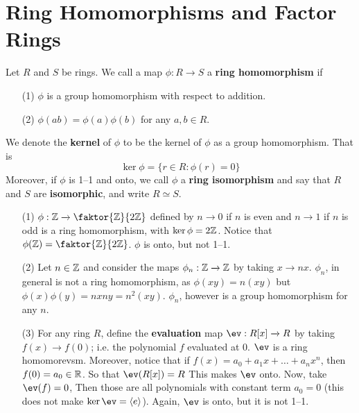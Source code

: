 \section{Ring Homomorphisms and Factor Rings}
\label{section_5.3}

\begin{definition}
  Let $R$ and  $S$ be rings. We call a map  $\phi:R \xrightarrow{} S$ a
  \textbf{ring homomorphism} if
  \begin{enumerate}
    \item[(1)] $\phi$ is a group homomorphism with respect to addition.

    \item[(2)] $\phi(ab)=\phi(a)\phi(b)$ for any $a,b \in R$.
  \end{enumerate}
  We denote the \textbf{kernel} of $\phi$ to be the kernel of $\phi$ as a
  group homomorphism. That is
  \begin{equation*}
    \ker{\phi}=\{r \in R : \phi(r)=0\}
  \end{equation*}
  Moreover, if $\phi$ is 1--1 and onto, we call $\phi$ a \textbf{ring
  isomorphism} and say that $R$ and $S$ are \textbf{isomorphic},
  and write $R \simeq S$.
\end{definition}

\begin{example}\label{example_5.9}
  \begin{enumerate}
    \item[(1)] $\phi:\Z \xrightarrow{} \faktor{\Z}{2\Z}$ defined by $n
      \xrightarrow{} 0$ if $n$ is even and  $n \xrightarrow{} 1$ if $n$ is
      odd is a ring homomorphism, with  $\ker{\phi}=2\mathbb{Z}$. Notice that
      $\phi(\Z)=\faktor{\Z}{2\Z}$. $\phi$ is onto, but not 1--1.

    \item[(2)] Let $n \in \mathbb{Z}$ and consider the maps  $\phi_n:\mathbb{Z}
      \xrightarrow{} \mathbb{Z}$ by taking $x \xrightarrow{} nx$. $\phi_n$, in
      general is not a ring homomorphism, as  $\phi(xy)=n(xy)$ but
      $\phi(x)\phi(y)=nxny=n^2(xy)$. $\phi_n$, however is a group
      homomorphism for any $n$.

    \item[(3)] For any ring $R$, define the \textbf{evaluation} map
      $\ev:R[x] \xrightarrow{} R$ by taking $f(x) \xrightarrow{} f(0)$;
      i.e. the polynomial $f$ evaluated at $0$.  $\ev$ is a ring
      homomorevsm. Moreover, notice that if
      $f(x)=a_0+a_1x+\dots+a_nx^n$, then $f(0)=a_0 \in \mathbb{R}$. So that
      $\ev(R[x])=R$ This makes $\ev$ onto. Now, take  $\ev(f)=0$, Then
      those are all polynomials with constant term $a_0=0$ (this does not
      make $\ker{\ev}=\langle e \rangle$). Again, $\ev$ is onto, but it
      is not 1--1.
  \end{enumerate}
\end{example}

